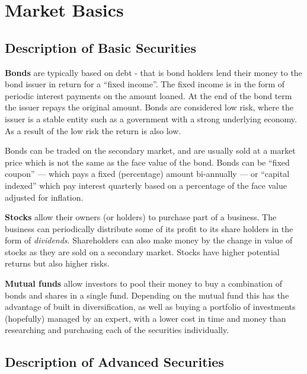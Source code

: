\chapter{Market Basics}
\label{ch:marketbasics}


\section{Description of Basic Securities}

\textbf{Bonds} are typically based on debt - that is bond holders lend their money to the bond issuer in return for a ``fixed income''. The fixed income is in the form of periodic interest payments on the amount loaned. At the end of the bond term the issuer repays the original amount. Bonds are considered low risk, where the issuer is a stable entity such as a government with a strong underlying economy. As a result of the low risk the return is also low. 

Bonds can be traded on the secondary market, and are usually sold at a market price which is not the same as the face value of the bond. Bonds can be ``fixed coupon'' --- which pays a fixed (percentage) amount bi-annually --- or ``capital indexed'' which pay interest quarterly based on a percentage of the face value adjusted for inflation.

\textbf{Stocks} allow their owners (or holders) to purchase part of a business. The business can periodically distribute some of its profit to its share holders in the form of {\it dividends}. Shareholders can also make money by the change in value of stocks as they are sold on a secondary market. Stocks have higher potential returns but also higher risks.

\textbf{Mutual funds} allow investors to pool their money to buy a combination of bonds and shares in a single fund. Depending on the mutual fund this has the advantage of built in diversification, as well as buying a portfolio of investments (hopefully) managed by an expert, with a lower cost in time and money than researching and purchasing each of the securities individually.

\section{Description of Advanced Securities}

